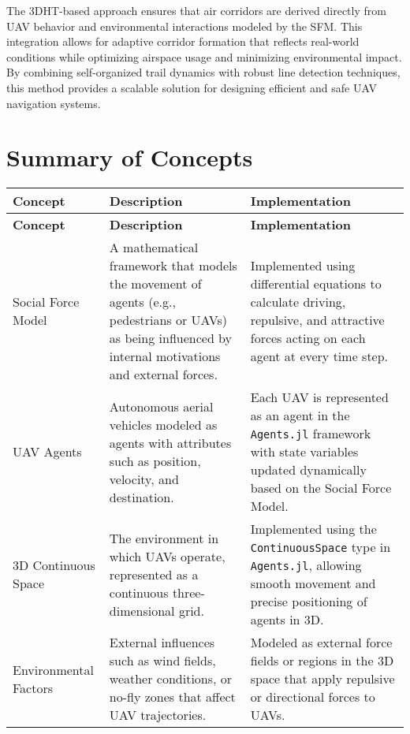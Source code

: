 \documentclass[letterpaper,11pt]{article}
\begin{document}
The 3DHT-based approach ensures that air corridors are derived directly from UAV behavior and environmental interactions modeled by the SFM. This integration allows for adaptive corridor formation that reflects real-world conditions while optimizing airspace usage and minimizing environmental impact. By combining self-organized trail dynamics with robust line detection techniques, this method provides a scalable solution for designing efficient and safe UAV navigation systems.

\section{Summary of Concepts}
\begin{longtable}{|p{}|p{}|p{}|}
    \hline
    \textbf{Concept} & \textbf{Description} & \textbf{Implementation} \\ \hline
    \endfirsthead
    \hline
    \textbf{Concept} & \textbf{Description} & \textbf{Implementation} \\ \hline
    \endhead
    \hline
    \endfoot
    
    Social Force Model & A mathematical framework that models the movement of agents (e.g., pedestrians or UAVs) as being influenced by internal motivations and external forces. & Implemented using differential equations to calculate driving, repulsive, and attractive forces acting on each agent at every time step. \\ \hline
    
    UAV Agents & Autonomous aerial vehicles modeled as agents with attributes such as position, velocity, and destination. & Each UAV is represented as an agent in the \texttt{Agents.jl} framework with state variables updated dynamically based on the Social Force Model. \\ \hline
    
    3D Continuous Space & The environment in which UAVs operate, represented as a continuous three-dimensional grid. & Implemented using the \texttt{ContinuousSpace} type in \texttt{Agents.jl}, allowing smooth movement and precise positioning of agents in 3D. \\ \hline
    
    Environmental Factors & External influences such as wind fields, weather conditions, or no-fly zones that affect UAV trajectories. & Modeled as external force fields or regions in the 3D space that apply repulsive or directional forces to UAVs. \\ \hline
    

\end{longtable}
\end{document}
